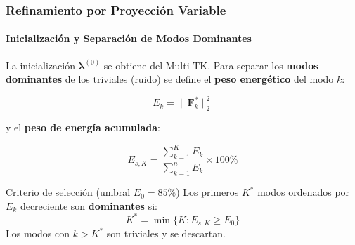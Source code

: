 \documentclass{beamer}
\begin{document}
\begin{frame}
\frametitle{Refinamiento por Proyección Variable}
\framesubtitle{Inicialización y Separación de Modos Dominantes}

La inicialización $\bm{\lambda}^{(0)}$ se obtiene del Multi-TK. Para separar los \textbf{modos dominantes} de los triviales (ruido) se define el \textbf{peso energético} del modo $k$:

\begin{equation}
    E_k = \|\mathbf{F}^*_k\|_2^2
    \label{eq:energy_weight}
\end{equation}

y el \textbf{peso de energía acumulada}:

\begin{equation}
    E_{s,K} = \frac{\displaystyle\sum_{k=1}^{K} E_k}{\displaystyle\sum_{k=1}^{n} E_k}
    \times 100\%
    \label{eq:cumulative_energy}
\end{equation}

\begin{block}{Criterio de selección (umbral $E_0 = 85\%$)}
    Los primeros $K^*$ modos ordenados por $E_k$ decreciente son \textbf{dominantes} si:
    \begin{equation}
        K^* = \min\bigl\{K : E_{s,K} \geq E_0\bigr\}
        \label{eq:dominant}
    \end{equation}
    Los modos con $k > K^*$ son triviales y se descartan.
\end{block}

\end{frame}
\end{document}
